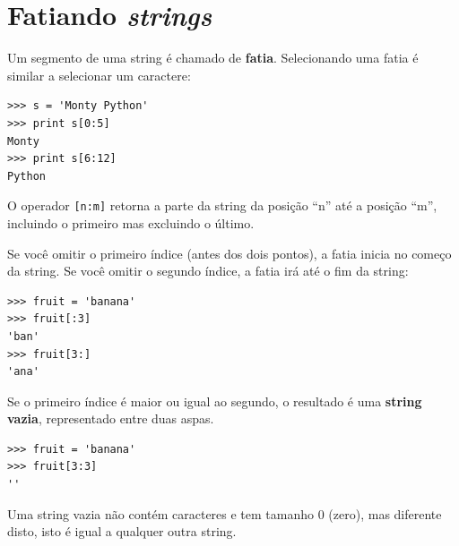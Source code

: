 {%
\section{Fatiando {\it strings}}
\label{fatia}


Um segmento de uma string é chamado de {\bf fatia}. Selecionando uma fatia
é similar a selecionar um caractere:

\beforeverb
\begin{verbatim}
>>> s = 'Monty Python'
>>> print s[0:5]
Monty
>>> print s[6:12]
Python
\end{verbatim}
\afterverb
%
%
O operador {\tt[n:m]} retorna a parte da string da posição ``n'' até a
posição ``m'', incluindo o primeiro mas excluindo o último.

Se você omitir o primeiro índice (antes dos dois pontos), a fatia inicia no
começo da string. Se você omitir o segundo índice, a fatia irá até o fim da
string:

\beforeverb
\begin{verbatim}
>>> fruit = 'banana'
>>> fruit[:3]
'ban'
>>> fruit[3:]
'ana'
\end{verbatim}
\afterverb
%
Se o primeiro índice é maior ou igual ao segundo, o resultado é uma
{\bf string vazia}, representado entre duas aspas.


\beforeverb
\begin{verbatim}
>>> fruit = 'banana'
>>> fruit[3:3]
''
\end{verbatim}
\afterverb
%
%
Uma string vazia não contém caracteres e tem tamanho 0 (zero), mas diferente
disto, isto é igual a qualquer outra string.

}

